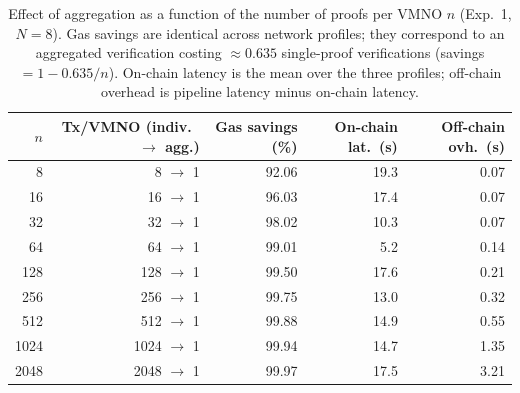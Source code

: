 \begin{table}[t]
\centering
\footnotesize
\caption{Effect of aggregation as a function of the number of proofs per VMNO $n$ (Exp.~1, $N=8$). Gas savings are identical across network profiles; they correspond to an aggregated verification costing $\approx 0.635$ single-proof verifications (savings $=1-0.635/n$). On-chain latency is the mean over the three profiles; off-chain overhead is pipeline latency minus on-chain latency.}
\label{tab:gas}
\begin{tabular}{@{}rrrrr@{}}
\toprule
$n$ & Tx/VMNO (indiv.\ $\to$ agg.) & Gas savings (\%) & On-chain lat.\ (s) & Off-chain ovh.\ (s) \\
\midrule
8 & 8 $\to$ 1 & 92.06 & 19.3 & 0.07 \\
16 & 16 $\to$ 1 & 96.03 & 17.4 & 0.07 \\
32 & 32 $\to$ 1 & 98.02 & 10.3 & 0.07 \\
64 & 64 $\to$ 1 & 99.01 & 5.2 & 0.14 \\
128 & 128 $\to$ 1 & 99.50 & 17.6 & 0.21 \\
256 & 256 $\to$ 1 & 99.75 & 13.0 & 0.32 \\
512 & 512 $\to$ 1 & 99.88 & 14.9 & 0.55 \\
1024 & 1024 $\to$ 1 & 99.94 & 14.7 & 1.35 \\
2048 & 2048 $\to$ 1 & 99.97 & 17.5 & 3.21 \\
\bottomrule
\end{tabular}
\end{table}